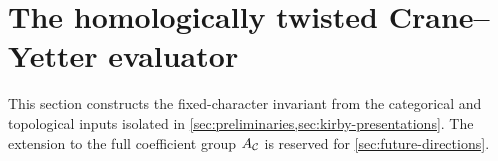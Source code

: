 \section{The homologically twisted Crane--Yetter evaluator}
\label{sec:evaluator}

This section constructs the fixed-character invariant from the categorical
and topological inputs isolated in
\cref{sec:preliminaries,sec:kirby-presentations}.  The extension to the full
coefficient group $A_{\mathcal{C}}$ is reserved for \cref{sec:future-directions}.



